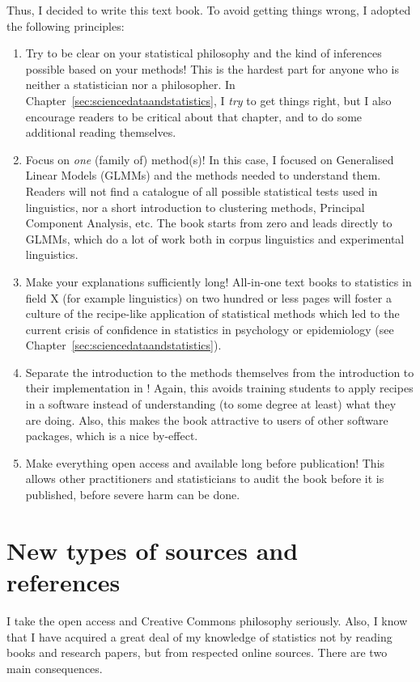 Thus, I decided to write this text book.
To avoid getting things wrong, I adopted the following principles:

\begin{enumerate}
  \item Try to be clear on your statistical philosophy and the kind of inferences possible based on your methods!
    This is the hardest part for anyone who is neither a statistician nor a philosopher.
    In Chapter~\ref{sec:sciencedataandstatistics}, I \textit{try} to get things right, but I also encourage readers to be critical about that chapter, and to do some additional reading themselves.
  \item Focus on \textit{one} (family of) method(s)!
    In this case, I focused on Generalised Linear Models (GLMMs) and the methods needed to understand them.
    Readers will not find a catalogue of all possible statistical tests used in linguistics, nor a short introduction to clustering methods, Principal Component Analysis, etc.
    The book starts from zero and leads directly to GLMMs, which do a lot of work both in corpus linguistics and experimental linguistics.
  \item Make your explanations sufficiently long!
    All-in-one text books to statistics in field X (for example linguistics) on two hundred or less pages will foster a culture of the recipe-like application of statistical methods which led to the current crisis of confidence in statistics in psychology or epidemiology (see Chapter~\ref{sec:sciencedataandstatistics}).
  \item Separate the introduction to the methods themselves from the introduction to their implementation in !
    Again, this avoids training students to apply recipes in a software instead of understanding (to some degree at least) what they are doing.
    Also, this makes the book attractive to users of other software packages, which is a nice by-effect.
  \item Make everything open access and available long before publication!
    This allows other practitioners and statisticians to audit the book before it is published, \ie before severe harm can be done.
\end{enumerate}

\section{New types of sources and references}

I take the open access and Creative Commons philosophy seriously.
Also, I know that I have acquired a great deal of my knowledge of statistics not by reading books and research papers, but from respected online sources.
There are two main consequences.

